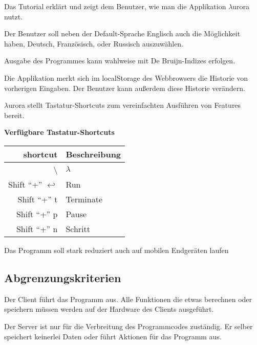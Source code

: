 \documentclass[parskip=full,11pt,twoside]{scrartcl}
\begin{document}
Das Tutorial erklärt und zeigt dem Benutzer, wie man die Applikation $\lambda$urora nutzt.

Der Benutzer soll neben der Default-Sprache Englisch auch die Möglichkeit haben, Deutsch, Französisch, oder Russisch auszuwählen.

Ausgabe des Programmes kann wahlweise mit De Bruijn-Indizes erfolgen.

Die Applikation merkt sich im localStorage des Webbrowsers die Historie von vorherigen Eingaben. Der Benutzer kann außerdem diese Historie verändern.

$\lambda$urora stellt Tastatur-Shortcuts zum vereinfachten Ausführen von Features bereit.

\textbf{Verfügbare Tastatur-Shortcuts}

\label{shortcuts}
\begin{tabular}{|r|l|}

    \hline
    shortcut & Beschreibung \\ \hline
    \textbackslash & $\lambda$ \\ \hline
    Shift \enquote{+} $\hookleftarrow$ & Run \\ \hline
    Shift \enquote{+} t & Terminate \\ \hline
    Shift \enquote{+} p & Pause \\ \hline
    Shift \enquote{+} n & Schritt \\ \hline


\end{tabular}

Das Programm soll stark reduziert auch auf mobilen Endgeräten laufen

\subsection{Abgrenzungskriterien}

Der Client führt das Programm aus. Alle Funktionen die etwas berechnen oder speichern müssen werden auf der Hardware des Clients ausgeführt.

Der Server ist nur für die Verbreitung des Programmcodes zuständig. Er selber speichert keinerlei Daten oder führt Aktionen für das Programm aus.
\end{document}
